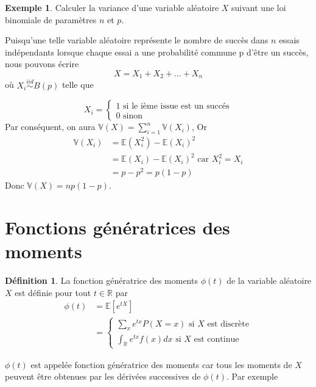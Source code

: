 \documentclass[
]{book}
\theoremstyle{definition}
\newtheorem{definition}{Définition}[chapter]
\theoremstyle{definition}
\newtheorem{example}{Exemple}[chapter]
\theoremstyle{definition}
\theoremstyle{remark}
\begin{document}
\begin{example}
\protect\hypertarget{exm:unnamed-chunk-12}{}{\label{exm:unnamed-chunk-12} }Calculer la variance d'une variable aléatoire \(X\) suivant une loi binomiale de paramètres \(n\) et \(p\).

Puisqu'une telle variable aléatoire représente le nombre de succès dans \(n\) essais indépendants lorsque chaque essai a une probabilité commune p d'être un succès,
nous pouvons écrire
\[
X=X_1+X_2+\ldots+X_n
\]
où \(X_i \stackrel{iid}{\sim}B(p)\) telle que
\end{example}

\[
X_i=\begin{cases}
1 \text{ si le ième issue est un succés}\\
0 \text{ sinon}
\end{cases}
\]
Par conséquent, on aura \(\mathbb{V}(X)=\displaystyle \sum_{i=1}^n\mathbb{V}(X_i)\), Or
\begin{align*}
\mathbb{V}(X_i)&=\mathbb{E}(X_i^2)-{\mathbb{E}(X_i)}^2\\
&=\mathbb{E}(X_i)-{\mathbb{E}(X_i)}^2 \text{ car } X_i^2=X_i\\
&= p-p^2= p(1-p)
\end{align*}
Donc \(\mathbb{V}(X)=np(1-p)\).

\hypertarget{fonctions-guxe9nuxe9ratrices-des-moments}{%
\section{Fonctions génératrices des moments}\label{fonctions-guxe9nuxe9ratrices-des-moments}}

\begin{definition}
\protect\hypertarget{def:unnamed-chunk-13}{}{\label{def:unnamed-chunk-13} }La fonction génératrice des moments \(\phi(t)\) de la variable aléatoire \(X\) est définie pour tout \(t \in \mathbb{R}\) par
\begin{align*}
\phi(t)&=\mathbb{E}\left[e^{tX} \right]\\
&= \begin{cases}
\displaystyle \sum_x e^{tx}P(X=x)\text{ si } X \text{ est discrète}\\
\displaystyle \int_{\mathbb{R}}e^{tx} f(x)dx \text{ si } X \text{ est continue}
\end{cases}
\end{align*}
\end{definition}

\(\phi(t)\) est appelée fonction génératrice des moments car tous les moments de \(X\) peuvent être obtenues par les dérivées successives de \(\phi(t)\). Par exemple
\end{document}
